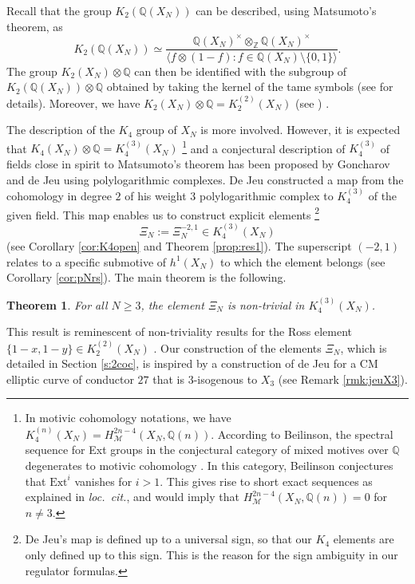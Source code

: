 \documentclass[11pt,a4,leqno]{amsart}
\theoremstyle{my theoremstyle}
\newtheorem{thm}{Theorem}[section]
\theoremstyle{dfn}
\theoremstyle{remark}
\renewcommand{\1}{\mathbbm{1}}
\newcommand{\Z}{\mathbb{Z}}
\newcommand{\Q}{\mathbb{Q}}
\numberwithin{equation}{section}
\begin{document}
Recall that the group $K_2(\Q(X_N))$ can be described, using Matsumoto's theorem, as
\[
K_2(\Q(X_N)) \simeq \frac{\Q(X_N)^\times \otimes_{\Z} \Q(X_N)^\times}{\langle f \otimes (1-f) \colon f\in \Q(X_N)\setminus \{ 0,1 \} \rangle}.
\]
The group $K_2(X_N) \otimes \Q$ can then be identified with the subgroup of $K_2(\Q(X_N)) \otimes \Q$ obtained by taking the kernel of the tame symbols (see \cite[Section 1]{Ross94} for details). Moreover, we have $K_2(X_N) \otimes \Q = K_2^{(2)}(X_N)$ (see \cite[Section 7.4]{Nek94}) .

The description of the $K_4$ group of $X_N$ is more involved. However, it is expected that $K_4(X_N)\otimes \Q = K_4^{(3)}(X_N)$
\footnote{In motivic cohomology notations, we have $K_4^{(n)}(X_N) = H^{2n-4}_{\mathcal{M}}(X_N, \Q(n))$. According to Beilinson, the spectral sequence for \textrm{Ext} groups in the conjectural category of mixed motives over $\Q$ degenerates to motivic cohomology \cite[Section 3.6]{Nek94}. In this category, Beilinson conjectures that $\mathrm{Ext}^i$ vanishes for $i>1$. This gives rise to short exact sequences as explained in \emph{loc.~cit.}, and would imply that $H^{2n-4}_{\mathcal{M}}(X_N, \Q(n)) = 0$ for $n \neq 3$.}
and a conjectural description of $K_4^{(3)}$ of fields close in spirit to Matsumoto's theorem has been proposed by Goncharov \cite{Goncharov} and de Jeu \cite{Jeu95,Jeu96} using polylogarithmic complexes. De Jeu constructed a map \cite{Jeu96} from the cohomology in degree $2$ of his weight $3$ polylogarithmic complex to $K_4^{(3)}$ of the given field. This map enables us to construct explicit elements  \footnote{De Jeu's map is defined up to a universal sign, so that our $K_4$ elements are only defined up to this sign. This is the reason for the sign ambiguity in our regulator formulas.}
\[
\Xi_{N}:=\Xi_{N}^{-2,1}\in K_4^{(3)}(X_N)
\] 
(see Corollary \ref{cor:K4open} and Theorem \ref{prop:res1}). 
The superscript $(-2,1)$ relates to a specific submotive of $h^1(X_N)$ to which the element belongs (see Corollary \ref{cor:pNrs}). The main theorem is the following. 

\begin{thm}\label{thm1}
    For all $N\geq 3$, the element $\Xi_N$ is non-trivial in $K_4^{(3)}(X_N)$.
\end{thm}

This result is reminescent of non-triviality results for the Ross element $\{ 1-x, 1-y\}\in K_2^{(2)}(X_N)$ \cite[Theorem 1]{Ross94}. 
Our construction of the elements $\Xi_N$, which is detailed in Section \ref{s:2coc}, is inspired by a construction of de Jeu \cite{JeuSlides} for a CM elliptic curve of conductor $27$ that is $3$-isogenous to $X_3$ (see Remark \ref{rmk:jeuX3}).
\end{document}
